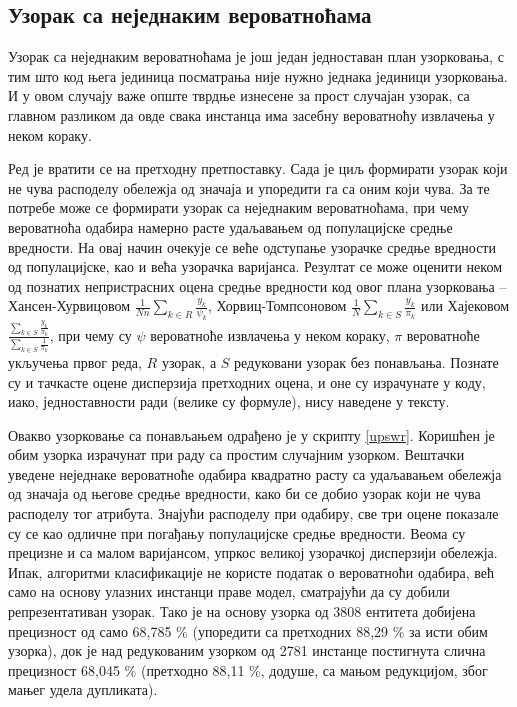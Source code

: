 \documentclass[a4paper]{article}
\begin{document}
\subsection{Узорак са неједнаким вероватноћама}

Узорак са неједнаким вероватноћама је још један једноставан план узорковања, с тим што код њега јединица посматрања није нужно једнака јединици узорковања.\cite{prez4} И у овом случају важе опште тврдње изнесене за прост случајан узорак, са главном разликом да овде свака инстанца има засебну вероватноћу извлачења у неком кораку.

Ред је вратити се на претходну претпоставку. Сада је циљ формирати узорак који не чува расподелу обележја од значаја и упоредити га са оним који чува. За те потребе може се формирати узорак са неједнаким вероватноћама, при чему вероватноћа одабира намерно расте удаљавањем од популацијске средње вредности. На овај начин очекује се веће одступање узорачке средње вредности од популацијске, као и већа узорачка варијанса. Резултат се може оценити неком од познатих непристрасних оцена средње вредности код овог плана узорковања -- Хансен-Хурвицовом $\frac{1}{Nn} \sum_{k \in R} \frac{y_k}{\psi_k}$, Хорвиц-Томпсоновом $\frac{1}{N} \sum_{k \in S} \frac{y_k}{\pi_k}$ или Хајековом $\frac{\sum_{k \in S} \frac{y_k}{\pi_k}}{\sum_{k \in S} \frac{1}{\pi_k}}$, при чему су $\psi$ вероватноће извлачења у неком кораку, $\pi$ вероватноће укључења првог реда, $R$ узорак, а $S$ редуковани узорак без понављања. Познате су и тачкасте оцене дисперзија претходних оцена, и оне су израчунате у коду, иако, једноставности ради (велике су формуле), нису наведене у тексту.

Овакво узорковање са понављањем одрађено је у скрипту \ref{upswr}. Коришћен је обим узорка израчунат при раду са простим случајним узорком. Вештачки уведене неједнаке вероватноће одабира квадратно расту са удаљавањем обележја од значаја од његове средње вредности, како би се добио узорак који не чува расподелу тог атрибута. Знајући расподелу при одабиру, све три оцене показале су се као одличне при погађању популацијске средње вредности. Веома су прецизне и са малом варијансом, упркос великој узорачкој дисперзији обележја. Ипак, алгоритми класификације не користе податак о вероватноћи одабира, већ само на основу улазних инстанци праве модел, сматрајући да су добили репрезентативан узорак. Тако је на основу узорка од 3808 ентитета добијена прецизност од само 68,785 \% (упоредити са претходних 88,29 \% за исти обим узорка), док је над редукованим узорком од 2781 инстанце постигнута слична прецизност 68,045 \% (претходно 88,11 \%, додуше, са мањом редукцијом, због мањег удела дупликата).
\end{document}

